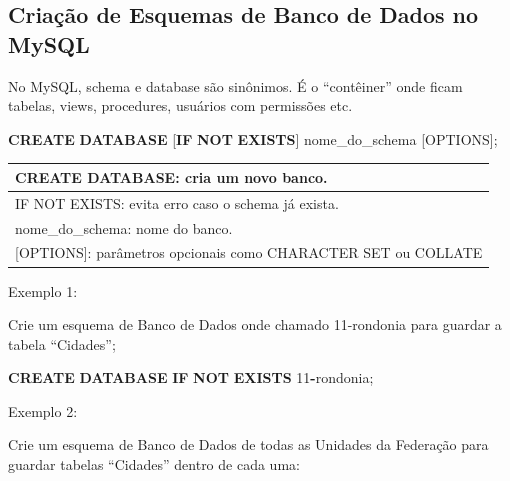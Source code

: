 \documentclass[
]{book}
\newenvironment{Shaded}{\begin{snugshade}}{\end{snugshade}}
\newcommand{\ControlFlowTok}[1]{\textcolor[rgb]{0.13,0.29,0.53}{\textbf{#1}}}
\newcommand{\DecValTok}[1]{\textcolor[rgb]{0.00,0.00,0.81}{#1}}
\newcommand{\KeywordTok}[1]{\textcolor[rgb]{0.13,0.29,0.53}{\textbf{#1}}}
\newcommand{\NormalTok}[1]{#1}
\newcommand{\OperatorTok}[1]{\textcolor[rgb]{0.81,0.36,0.00}{\textbf{#1}}}
\begin{document}
\subsection{Criação de Esquemas de Banco de Dados no MySQL}\label{criauxe7uxe3o-de-esquemas-de-banco-de-dados-no-mysql}

No MySQL, schema e database são sinônimos. É o ``contêiner'' onde ficam tabelas, views, procedures, usuários com permissões etc.

\begin{Shaded}
\begin{Highlighting}[]
\KeywordTok{CREATE} \KeywordTok{DATABASE}\NormalTok{ [}\ControlFlowTok{IF} \KeywordTok{NOT} \KeywordTok{EXISTS}\NormalTok{] nome\_do\_schema  [OPTIONS];}
\end{Highlighting}
\end{Shaded}

\begin{longtable}[]{@{}l@{}}
\toprule\noalign{}
CREATE DATABASE: cria um novo banco. \\
\midrule\noalign{}
\endhead
\bottomrule\noalign{}
\endlastfoot
IF NOT EXISTS: evita erro caso o schema já exista. \\
nome\_do\_schema: nome do banco. \\
{[}OPTIONS{]}: parâmetros opcionais como CHARACTER SET ou COLLATE \\
\end{longtable}

Exemplo 1:

Crie um esquema de Banco de Dados onde chamado 11-rondonia para guardar a tabela ``Cidades'';

\begin{Shaded}
\begin{Highlighting}[]
\KeywordTok{CREATE} \KeywordTok{DATABASE} \ControlFlowTok{IF} \KeywordTok{NOT} \KeywordTok{EXISTS}\NormalTok{ \textasciigrave{}}\DecValTok{11}\OperatorTok{{-}}\NormalTok{rondonia\textasciigrave{};}
\end{Highlighting}
\end{Shaded}

Exemplo 2:

Crie um esquema de Banco de Dados de todas as Unidades da Federação para guardar tabelas ``Cidades'' dentro de cada uma:
\end{document}
